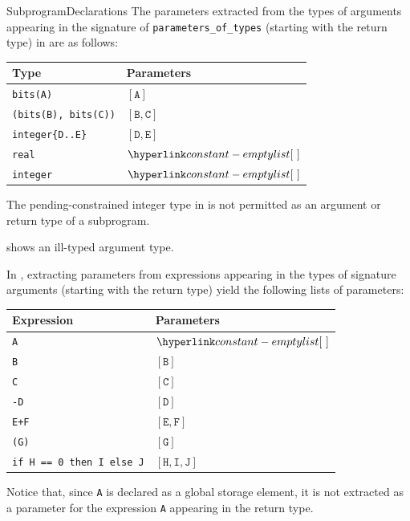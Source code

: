 \begin{TypingRuleList}{SubprogramDeclarations}
The parameters extracted from the types of arguments appearing in the signature of \verb|parameters_of_types|
(starting with the return type)
in  are as follows:
\begin{center}
\begin{tabular}{ll}
\textbf{Type} & \textbf{Parameters}\\
\hline
\verb|bits(A)|            & $[\texttt{A}]$\\
\verb|(bits(B), bits(C))| & $[\texttt{B}, \texttt{C}]$\\
\verb|integer{D..E}|      & $[\texttt{D}, \texttt{E}]$\\
\verb|real|               & $\emptylist$\\
\verb|integer|            & $\emptylist$\\
\end{tabular}
\end{center}


The pending-constrained integer type in  is not permitted as an argument or return type of a subprogram.

 shows an ill-typed argument type.




In , extracting parameters from expressions appearing
in the types of signature arguments (starting with the return type) yield the following lists of parameters:
\begin{center}
\begin{tabular}{ll}
\textbf{Expression} & \textbf{Parameters}\\
\hline
\verb|A|      & $\emptylist$\\
\verb|B|      & $[\texttt{B}]$\\
\verb|C|      & $[\texttt{C}]$\\
\verb|-D|      & $[\texttt{D}]$\\
\verb|E+F|      & $[\texttt{E}, \texttt{F}]$\\
\verb|(G)|      & $[\texttt{G}]$\\
\verb|if H == 0 then I else J|      & $[\texttt{H}, \texttt{I}, \texttt{J}]$\\
\end{tabular}
\end{center}
Notice that, since \verb|A| is declared as a global storage element, it is not extracted as a parameter
for the expression \verb|A| appearing in the return type.


\end{TypingRuleList}
